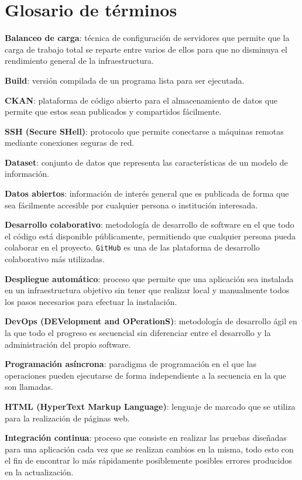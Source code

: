 \chapter{Glosario de términos}

\textbf{Balanceo de carga}: técnica de configuración de servidores que permite que la carga de trabajo total se reparte entre varios de ellos para que no disminuya el rendimiento general de la infraestructura.
\bigskip

\textbf{Build}: versión compilada de un programa lista para ser ejecutada.
\bigskip

\textbf{CKAN}: plataforma de código abierto para el almacenamiento de datos que permite que estos sean publicados y compartidos fácilmente.
\bigskip

\textbf{SSH (Secure SHell)}: protocolo que permite conectarse a máquinas remotas mediante conexiones seguras de red.
\bigskip

\textbf{Dataset}: conjunto de datos que representa las características de un modelo de información.
\bigskip

\textbf{Datos abiertos}: información de interés general que es publicada de forma que sea fácilmente accesible por cualquier persona o institución interesada.
\bigskip

\textbf{Desarrollo colaborativo}: metodología de desarrollo de software en el que todo el código está disponible públicamente, permitiendo que cualquier persona pueda colaborar en el proyecto. {\tt GitHub} es una de las plataforma de desarrollo colaborativo más utilizadas.
\bigskip

\textbf{Despliegue automático}: proceso que permite que una aplicación sea instalada en un infraestructura objetivo sin tener que realizar local y manualmente todos los pasos necesarios para efectuar la instalación.
\bigskip

\textbf{DevOps (DEVelopment and OPerationS)}: metodología de desarrollo ágil en la que todo el progreso es secuencial sin diferenciar entre el desarrollo y la administración del propio software.
\bigskip

\textbf{Programación asíncrona}: paradigma de programación en el que las operaciones pueden ejecutarse de forma independiente a la secuencia en la que son llamadas.
\bigskip

\textbf{HTML (HyperText Markup Language)}: lenguaje de marcado que se utiliza para la realización de páginas web.
\bigskip

\textbf{Integración continua}: proceso que consiste en realizar las pruebas diseñadas para una aplicación cada vez que se realizan cambios en la misma, todo esto con el fin de encontrar lo más rápidamente posiblemente posibles errores producidos en la actualización.
\bigskip

